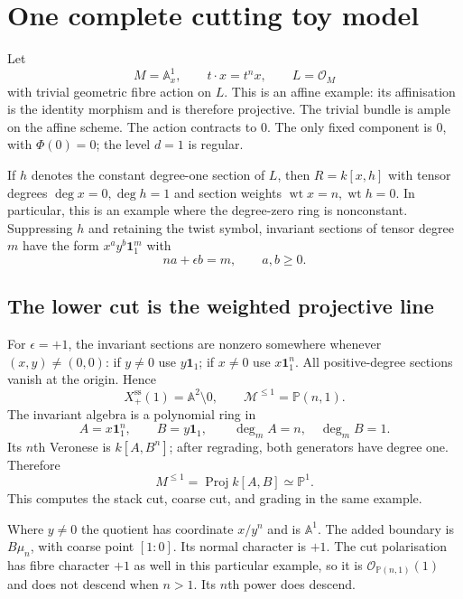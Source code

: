 \documentclass[11pt,a4paper]{article}
\numberwithin{equation}{section}
\theoremstyle{definition}
\newcommand{\A}{\mathbb A}
\newcommand{\PP}{\mathbb P}
\newcommand{\OO}{\mathcal O}
\newcommand{\cM}{\mathcal M}
\newcommand{\Proj}{\operatorname{Proj}}
\newcommand{\sst}{\mathrm{ss}}
\newcommand{\one}{\mathbf 1}
\begin{document}
\section{One complete cutting toy model}
\label{sec:toycut}

Let
\[
 M=\A^1_x,\qquad t\cdot x=t^n x,\qquad L=\OO_M
\]
with trivial geometric fibre action on $L$. This is an affine example:
its affinisation is the identity morphism and is therefore projective.
The trivial bundle is ample on
the affine scheme. The action contracts to $0$. The only fixed component
is $0$, with $\Phi(0)=0$; the level $d=1$ is regular.

If $h$ denotes the constant degree-one section of $L$, then
$R=k[x,h]$ with tensor degrees $\deg x=0,\deg h=1$ and section weights
$\operatorname{wt}x=n,\operatorname{wt}h=0$. In particular, this is an
example where the degree-zero ring is nonconstant. Suppressing $h$ and
retaining the twist symbol, invariant sections of tensor degree $m$ have
the form $x^a y^b\one_1^m$ with
\begin{equation}\label{eq:toyinvariance}
 na+\epsilon b=m,\qquad a,b\ge0.
\end{equation}

\subsection{The lower cut is the weighted projective line}
For $\epsilon=+1$, the invariant sections are nonzero somewhere whenever
$(x,y)\ne(0,0)$: if $y\ne0$ use $y\one_1$; if $x\ne0$ use
$x\one_1^n$. All positive-degree sections vanish at the origin. Hence
\[
 X^{\sst}_+(1)=\A^2\setminus0,
 \qquad\cM^{\le1}=\PP(n,1).
\]
The invariant algebra is a polynomial ring in
\[
 A=x\one_1^n,\qquad B=y\one_1,
 \qquad \deg_m A=n,\quad\deg_m B=1.
\]
Its $n$th Veronese is $k[A,B^n]$; after regrading, both generators have
degree one. Therefore
\[
 M^{\le1}=\Proj k[A,B]\simeq\PP^1.
\]
This computes the stack cut, coarse cut, and grading in the same example.

Where $y\ne0$ the quotient has coordinate $x/y^n$ and is $\A^1$.
The added boundary is $B\mu_n$, with coarse point $[1:0]$. Its normal
character is $+1$. The cut polarisation has fibre character $+1$ as well
in this particular example, so it is $\OO_{\PP(n,1)}(1)$ and does not
descend when $n>1$. Its $n$th power does descend.
\end{document}
